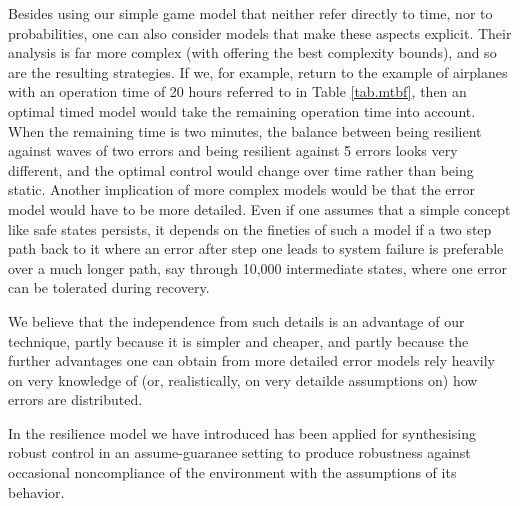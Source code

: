 Besides using our simple game model that neither refer directly to time, nor to probabilities, one can also consider models that make these aspects explicit.
Their analysis is far more complex (with \cite{FRSZ11} offering the best complexity bounds), and so are the resulting strategies.
If we, for example, return to the example of airplanes with an operation time of 20 hours referred to in Table \ref{tab.mtbf}, then an optimal timed model would take the remaining operation time into account.
When the remaining time is two minutes, the balance between being resilient against waves of two errors and being resilient against 5 errors looks very different, and the optimal control would change over time rather than being static.
Another implication of more complex models would be that the error model would have to be more detailed.
Even if one assumes that a simple concept like safe states persists, it depends on the fineties of such a model if a two step path back to it where an error after step one leads to system failure is preferable over a much longer path, say through 10,000 intermediate states, where one error can be tolerated during recovery.

We believe that the independence from such details is an advantage of our technique, partly because it is simpler and cheaper, and partly because the further advantages one can obtain from more detailed error models rely heavily on very knowledge of (or, realistically, on very detailde assumptions on) how errors are distributed.

In \cite{EhlersT14,BloemEJK14} the resilience model we have introduced \cite{HPSW/12/rapidRecovery} has been applied for synthesising robust control in an assume-guaranee setting to produce robustness against occasional noncompliance of the environment with the assumptions of its behavior.
